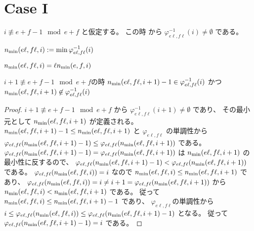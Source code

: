 \section{Case I}

$
i \not \equiv e + f - 1 \mod e + f
$
と仮定する。
この時
から
$
\varphi_{e \ell, f \ell}^{-1}(i)
\ne
\emptyset
$
である。

\begin{definition}
\label{df:main_lemma.n_min_l}
\leanok
$
n_{\mathrm{min}}(e \ell, f \ell, i)
:=
\min \varphi_{e \ell, f \ell}^{-1}(i)
$
\end{definition}

\begin{lemma}
\label{lm:main_lemma.min_l_eq_l_mul_min_1}
\leanok
$
n_{\mathrm{min}}(e \ell, f \ell, i) = \ell n_{\mathrm{min}}(e, f, i)
$
\end{lemma}

\begin{lemma}
\label{lm:main_lemma.case_a}
\leanok
$i + 1 \not \equiv e + f - 1 \mod e + f$の時
$
n_{\mathrm{min}} (e \ell, f \ell, i+1) - 1
\in
\varphi_{e \ell, f \ell}^{-1}(i)
$
かつ
$
n_{\mathrm{min}} (e \ell, f \ell, i+1)
\not \in
\varphi_{e \ell, f \ell}^{-1}(i)
$
\end{lemma}

\begin{proof}
$
i + 1 \not \equiv e + f - 1 \mod e + f
$
から
$
\varphi_{e \ell, f \ell}^{-1}(i+1) \ne \emptyset
$
であり、
その最小元として
$
n_{\mathrm{min}} (e \ell, f \ell, i+1)
$
が定義される。
$
n_{\mathrm{min}} (e \ell, f \ell, i+1) - 1
\le
n_{\mathrm{min}} (e \ell, f \ell, i+1)
$
と
$
\varphi_{e \ell, f \ell}
$
の単調性から
$
\varphi_{e \ell, f \ell}(n_{\mathrm{min}} (e \ell, f \ell, i+1) - 1)
\le
\varphi_{e \ell, f \ell}(n_{\mathrm{min}} (e \ell, f \ell, i+1))
$
である。
$
\varphi_{e \ell, f \ell}(n_{\mathrm{min}} (e \ell, f \ell, i+1) - 1)
=
\varphi_{e \ell, f \ell}(n_{\mathrm{min}} (e \ell, f \ell, i+1))
$
は
$
n_{\mathrm{min}} (e \ell, f \ell, i+1)
$
の最小性に反するので、
$
\varphi_{e \ell, f \ell}(n_{\mathrm{min}} (e \ell, f \ell, i+1) - 1)
<
\varphi_{e \ell, f \ell}(n_{\mathrm{min}} (e \ell, f \ell, i+1))
$
である。
$
\varphi_{e \ell, f \ell}(n_{\mathrm{min}} (e \ell, f \ell, i)) = i
$
なので
$
n_{\mathrm{min}} (e \ell, f \ell, i)
\le
n_{\mathrm{min}} (e \ell, f \ell, i+1)
$
であり、
$
\varphi_{e \ell, f \ell}(n_{\mathrm{min}} (e \ell, f \ell, i))
=
i
\ne
i+1
=
\varphi_{e \ell, f \ell}(n_{\mathrm{min}} (e \ell, f \ell, i+1))
$
から
$
n_{\mathrm{min}} (e \ell, f \ell, i)
<
n_{\mathrm{min}} (e \ell, f \ell, i+1)
$
である。
従って
$
n_{\mathrm{min}} (e \ell, f \ell, i)
\le
n_{\mathrm{min}} (e \ell, f \ell, i+1) - 1
$
であり、
$\varphi_{e \ell, f \ell}$の単調性から
$
i
\le
\varphi_{e \ell, f \ell}( n_{\mathrm{min}} (e \ell, f \ell, i))
\le
\varphi_{e \ell, f \ell}( n_{\mathrm{min}} (e \ell, f \ell, i+1) - 1 )
$
となる。
従って
$
\varphi_{e \ell, f \ell}( n_{\mathrm{min}} (e \ell, f \ell, i+1) - 1 )
= i
$
である。
\end{proof}

